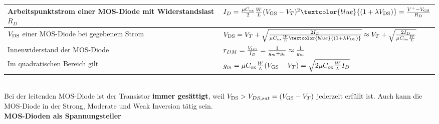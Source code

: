 \begin{tabular}{|l|l|}
    \hline
    Arbeitspunktstrom einer MOS-Diode mit Widerstandslast $R_D$ & $I_D = \frac{\mu C_{\rm ox}}{2}\frac{W}{L}(V_{\rm GS}-V_T)^2\textcolor{blue}{(1+\lambda V_{\rm DS})}= \frac{V^+-V_{\rm GS}}{R_D}$ \\
    \hline
    $V_{\rm DS}$ einer MOS-Diode bei gegebenem Strom                & $V_{\rm DS} = V_T + \sqrt{\frac{2 I_D}{\mu C_{\rm ox}\frac{W}{L} \textcolor{blue}{(1+\lambda V_{\rm DS})}}}\approx V_T + \sqrt{\frac{2 I_D}{\mu C_{\rm ox}\frac{W}{L}}}$ \\
    \hline
    Innenwiderstand der MOS-Diode                               & $r_{DM} = \frac{V_{\rm GS}}{I_D} = \frac{1}{g_m+g_o} \approx \frac{1}{g_m}$ \\
    \hline
    Im quadratischen Bereich gilt                               & $g_m = \mu C_{\rm ox}\frac{W}{L} (V_{\rm GS}-V_T) = \sqrt{2\mu C_{\rm ox}\frac{W}{L} I_D}$ \\
    \hline
\end{tabular}\vspace{5pt}\\
Bei der leitenden MOS-Diode ist der Transistor \textbf{immer gesättigt}, weil $V_{\rm DS}>V_{DS,sat} = (V_{\rm GS}-V_T)$ jederzeit erfüllt ist. Auch kann die MOS-Diode in der Strong, Moderate und Weak Inversion tätig sein. \\
\textbf{MOS-Dioden als Spannungsteiler}\\
\renewcommand{\arraystretch}{1}
